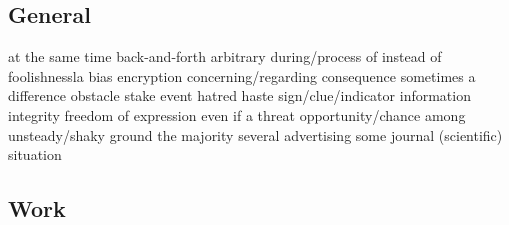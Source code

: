 \subsection*{General}
   {at the same time}
   {back-and-forth}
   {arbitrary}
   {during/process of}
   {instead of}
   {foolishness}{la}
   {bias}
   {encryption}
   {concerning/regarding}
   {consequence}
   {sometimes}
   {a difference}
   {obstacle}
   {stake}
   {event}
   {hatred}
   {haste}
   {sign/clue/indicator}
   {information}
   {integrity}
   {freedom of expression}
   {even if}
   {a threat}
   {opportunity/chance}
   {among}
   {unsteady/shaky ground}
   {the majority}
   {several}
   {advertising}
   {some}
   {journal (scientific)}
   {situation}

\subsection*{Work}

